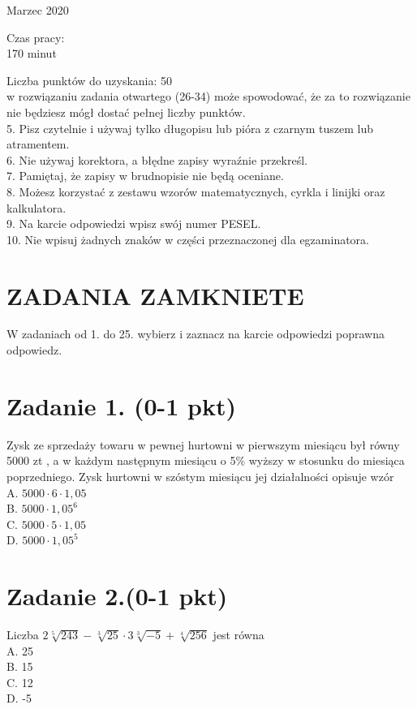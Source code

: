 \documentclass[10pt]{article}
\begin{document}
Marzec 2020

Czas pracy:\\
170 minut

Liczba punktów do uzyskania: 50\\
w rozwiązaniu zadania otwartego (26-34) może spowodować, że za to rozwiązanie nie będziesz mógł dostać pełnej liczby punktów.\\
5. Pisz czytelnie i używaj tylko długopisu lub pióra z czarnym tuszem lub atramentem.\\
6. Nie używaj korektora, a błędne zapisy wyraźnie przekreśl.\\
7. Pamiętaj, że zapisy w brudnopisie nie będą oceniane.\\
8. Możesz korzystać z zestawu wzorów matematycznych, cyrkla i linijki oraz kalkulatora.\\
9. Na karcie odpowiedzi wpisz swój numer PESEL.\\
10. Nie wpisuj żadnych znaków w części przeznaczonej dla egzaminatora.

\section*{ZADANIA ZAMKNIETE}
W zadaniach od 1. do 25. wybierz i zaznacz na karcie odpowiedzi poprawna odpowiedz.

\section*{Zadanie 1. (0-1 pkt)}
Zysk ze sprzedaży towaru w pewnej hurtowni w pierwszym miesiącu był równy 5000 zt , a w każdym następnym miesiącu o 5\% wyższy w stosunku do miesiąca poprzedniego. Zysk hurtowni w szóstym miesiącu jej działalności opisuje wzór\\
A. \(5000 \cdot 6 \cdot 1,05\)\\
B. \(5000 \cdot 1,05^{6}\)\\
C. \(5000 \cdot 5 \cdot 1,05\)\\
D. \(5000 \cdot 1,05^{5}\)

\section*{Zadanie 2.(0-1 pkt)}
Liczba \(2 \sqrt[5]{243}-\sqrt[3]{25} \cdot 3 \sqrt[3]{-5}+\sqrt[4]{256}\) jest równa\\
A. 25\\
B. 15\\
C. 12\\
D. -5
\end{document}
